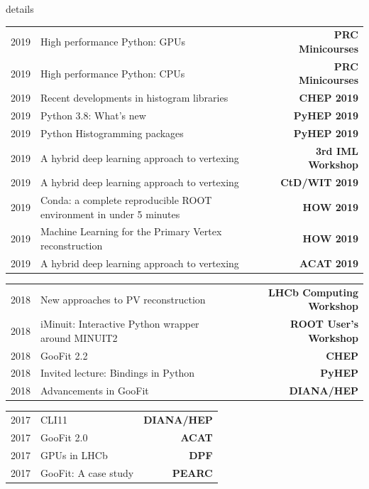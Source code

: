 \documentclass[10pt,letterpaper]{moderncv}
\begin{document}
\begin{taggedblock}{details}
\begin{tabularx}{\textwidth}{p{.33in}X>{\bfseries}r}
    2019 & High performance Python: GPUs & PRC Minicourses \\
    2019 & High performance Python: CPUs & PRC Minicourses \\
    2019 & Recent developments in histogram libraries  & CHEP 2019 \\
    2019 & Python 3.8: What's new & PyHEP 2019 \\
    2019 & Python Histogramming packages & PyHEP 2019\\
    2019 & A hybrid deep learning approach to vertexing & 3rd IML Workshop \\
    2019 & A hybrid deep learning approach to vertexing & CtD/WIT 2019 \\
    2019 & Conda: a complete reproducible ROOT environment in under 5 minutes & HOW 2019 \\
    2019 & Machine Learning for the Primary Vertex reconstruction & HOW 2019 \\
    2019 & A hybrid deep learning approach to vertexing & ACAT 2019 \\ %
\end{tabularx}

\begin{tabularx}{\textwidth}{p{.33in}X>{\bfseries}r}
    2018 & New approaches to PV reconstruction & LHCb Computing Workshop \\ %
    2018 & iMinuit: Interactive Python wrapper around MINUIT2 & ROOT User's Workshop \\  %
    2018 & GooFit 2.2 & CHEP \\ %
    2018 & Invited lecture: Bindings in Python & PyHEP  \\
    2018 & Advancements in GooFit & DIANA/HEP \\
\end{tabularx}

\begin{tabularx}{\textwidth}{p{.33in}X>{\bfseries}r}
    2017 & CLI11 & DIANA/HEP \\
    2017 & GooFit 2.0 & ACAT \\
    2017 & GPUs in LHCb & DPF \\ %
    2017 & GooFit: A case study & PEARC \\

\end{tabularx}


\end{taggedblock}
\end{document}
